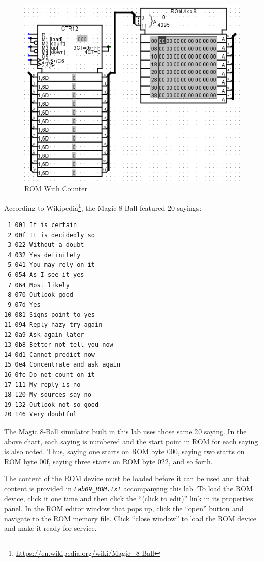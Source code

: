 \begin{figure}[H]
	\centering
	\includegraphics[width=\maxwidth{.95\linewidth}]{gfx/09-02}
	\caption{ROM With Counter}
	\label{fig:09-02}
\end{figure}

According to Wikipedia\footnote{\url{https://en.wikipedia.org/wiki/Magic_8-Ball}}, the Magic 8-Ball featured 20 sayings: 

\begin{verbatim}
 1 001 It is certain
 2 00f It is decidedly so
 3 022 Without a doubt
 4 032 Yes definitely
 5 041 You may rely on it
 6 054 As I see it yes
 7 064 Most likely
 8 070 Outlook good
 9 07d Yes
10 081 Signs point to yes
11 094 Reply hazy try again
12 0a9 Ask again later
13 0b8 Better not tell you now
14 0d1 Cannot predict now
15 0e4 Concentrate and ask again
16 0fe Do not count on it
17 111 My reply is no
18 120 My sources say no
19 132 Outlook not so good
20 146 Very doubtful
\end{verbatim}

The Magic 8-Ball simulator built in this lab uses those same 20 saying. In the above chart, each saying is numbered and the start point in ROM for each saying is also noted. Thus, saying one starts on ROM byte 000, saying two starts on ROM byte 00f, saying three starts on ROM byte 022, and so forth.

The content of the ROM device must be loaded before it can be used and that content is provided in \emph{\texttt{Lab09\_ROM.txt}} accompanying this lab. To load the ROM device, click it one time and then click the ``(click to edit)'' link in its properties panel. In the ROM editor window that pops up, click the ``open'' button and navigate to the ROM memory file. Click ``close window'' to load the ROM device and make it ready for service.

